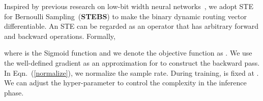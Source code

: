 \documentclass[10pt,twocolumn,letterpaper]{article}
\begin{document}
Inspired by previous research on low-bit width neural networks~\cite{dorefanet, hubara2017quantized}, we adopt STE for Bernoulli Sampling~(\textbf{STEBS}) to make the binary dynamic routing vector differentiable. An STE can be regarded as an operator that has arbitrary forward and backward operations. Formally,



where  is the Sigmoid function and we denote the objective function as . We use the well-defined gradient  as an approximation for  to construct the backward pass. In Eqn.~(\ref{normalize}), we normalize the sample rate. During training,  is fixed at . We can adjust the hyper-parameter  to control the complexity in the inference phase.

\begin{table*}[th]
\centering
\caption{
\textbf{Quantitative results on the DAVIS17-Val~\cite{davis} and Vimeo90K-Test~\cite{vimeo} benchmarks}. We denote DMVFN without routing as ``DMVFN~(w/o r)''. ``N/A'' means not available. }
\centering
{}
\label{table:davis-vimeo}
\end{table*}
\end{document}
